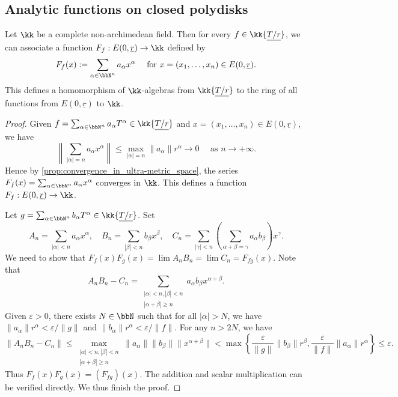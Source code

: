 \subsection{Analytic functions on closed polydisks}

    \begin{proposition}\label{prop:Tate_algebra_as_functions_ring}
        Let \(\kk\) be a complete non-archimedean field.
        Then for every \(f \in \kk\{ \underline{T/r} \} \), we can associate a function \(F_f:E(0,\underline{r}) \to \kk\) defined by
        \[ F_f(x) := \sum_{\alpha \in \bbN^n} a_\alpha x^\alpha \quad \text{ for } x = (x_1, \ldots, x_n) \in E(0,\underline{r}). \]
        This defines a homomorphism of \(\kk\)-algebras from \(\kk\{ \underline{T/r} \} \) to the ring of all functions from \(E(0,\underline{r})\) to \(\kk\).
    \end{proposition}
    \begin{proof}
        Given \(f = \sum_{\alpha \in \bbN^n} a_\alpha T^\alpha \in \kk\{ \underline{T/r} \} \) and \(x = (x_1, \ldots, x_n) \in E(0,\underline{r})\), we have
        \[ \left\|\sum_{|\alpha| = n} a_\alpha x^\alpha\right\| \leq \max_{|\alpha| = n} \|a_\alpha\| r^\alpha \to 0 \quad \text{ as } n \to +\infty. \]
        Hence by \cref{prop:convergence_in_ultra-metric_space}, the series \(F_f(x) = \sum_{\alpha \in \bbN^n} a_\alpha x^\alpha\) converges in \(\kk\).
        This defines a function \(F_f:E(0,\underline{r}) \to \kk\).

        Let \(g = \sum_{\alpha \in \bbN^n} b_\alpha T^\alpha \in \kk\{ \underline{T/r} \} \).
        Set 
        \[ A_n = \sum_{|\alpha|<n} a_\alpha x^\alpha, \quad B_n = \sum_{|\beta|<n} b_\beta x^\beta, \quad C_n = \sum_{|\gamma|<n} \left(\sum_{\alpha+\beta = \gamma} a_\alpha b_\beta \right) x^\gamma. \]
        We need to show that \(F_f(x)F_g(x) = \lim A_nB_n = \lim C_n = F_{fg}(x)\).
        Note that 
        \[ A_nB_n - C_n = \sum_{\substack{|\alpha|<n, |\beta|<n \\ |\alpha + \beta| \geq n}} a_\alpha b_\beta x^{\alpha + \beta}. \]
        Given \(\varepsilon > 0\), there exists \(N \in \bbN\) such that for all \(|\alpha| > N\), we have \(\|a_\alpha\| r^\alpha < \varepsilon/\|g\|\) and \(\|b_\alpha\| r^\alpha < \varepsilon/\|f\|\).
        For any \(n > 2N\), we have
        \[ \|A_nB_n - C_n\| \leq \max_{\substack{|\alpha|<n, |\beta|<n \\ |\alpha + \beta| \geq n}} \|a_\alpha\| \|b_\beta\| \|x^{\alpha + \beta}\| < \max\left\{ \frac{\varepsilon}{\|g\|} \|b_{\beta}\|r^\beta, \frac{\varepsilon}{\|f\|} \|a_{\alpha}\|r^\alpha \right\} \leq \varepsilon. \]
        Thus \(F_f(x)F_g(x) = (F_{fg})(x)\).
        The addition and scalar multiplication can be verified directly.
        We thus finish the proof.
    \end{proof}

